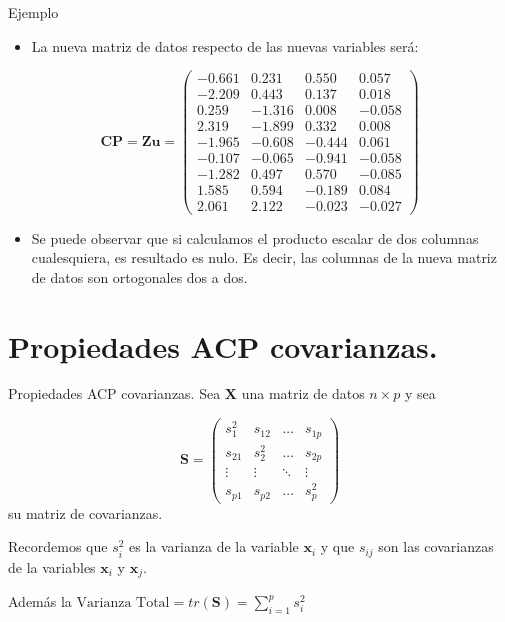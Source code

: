 \documentclass[
  spanish,
  ignorenonframetext,
]{beamer}
\providecommand{\tightlist}{%
  \setlength{\itemsep}{0pt}\setlength{\parskip}{0pt}}
\begin{document}
\begin{frame}{Ejemplo}
\protect\hypertarget{ejemplo-9}{}
\begin{itemize}
\tightlist
\item
  La nueva matriz de datos respecto de las nuevas variables será:
\end{itemize}

\[
\mathbf{CP} = \mathbf{Z} \mathbf{u} =
\begin{pmatrix}
-0.661 & 0.231 & 0.550 & 0.057 \\
 -2.209 & 0.443 & 0.137 & 0.018 \\
 0.259 & -1.316 & 0.008 & -0.058 \\
 2.319 & -1.899 & 0.332 & 0.008 \\
 -1.965 & -0.608 & -0.444 & 0.061 \\
 -0.107 & -0.065 & -0.941 & -0.058 \\
 -1.282 & 0.497 & 0.570 & -0.085 \\
 1.585 & 0.594 & -0.189 & 0.084 \\
 2.061 & 2.122 & -0.023 & -0.027 
\end{pmatrix}
\]

\begin{itemize}
\tightlist
\item
  Se puede observar que si calculamos el producto escalar de dos
  columnas cualesquiera, es resultado es nulo. Es decir, las columnas de
  la nueva matriz de datos son ortogonales dos a dos.
\end{itemize}
\end{frame}

\hypertarget{propiedades-acp-covarianzas.}{%
\section{Propiedades ACP
covarianzas.}\label{propiedades-acp-covarianzas.}}

\begin{frame}{Propiedades ACP covarianzas.}
\protect\hypertarget{propiedades-acp-covarianzas.-1}{}
Sea \(\mathbf{X}\) una matriz de datos \(n\times p\) y sea

\[
\mathbf{S}=\begin{pmatrix}
s_1^2& s_{ 1 2}&\ldots &  s_{1 p}\\
s_{2 1}& s_{2}^2&\ldots &  s_{2 p}\\
\vdots & \vdots &  \ddots & \vdots\\
s_{p 1}& s_{ p 2}&\ldots &  s_{p}^2
\end{pmatrix}
\] su matriz de covarianzas.

Recordemos que \(s_i^2\) es la varianza de la variable \(\mathbf{x}_i\)
y que \(s_{i j}\) son las covarianzas de la variables \(\mathbf{x}_i\) y
\(\mathbf{x}_j\).

Además la \(\mbox{Varianza Total}= tr(\mathbf{S})=\sum_{i=1}^p s_i^2\)
\end{frame}
\end{document}
